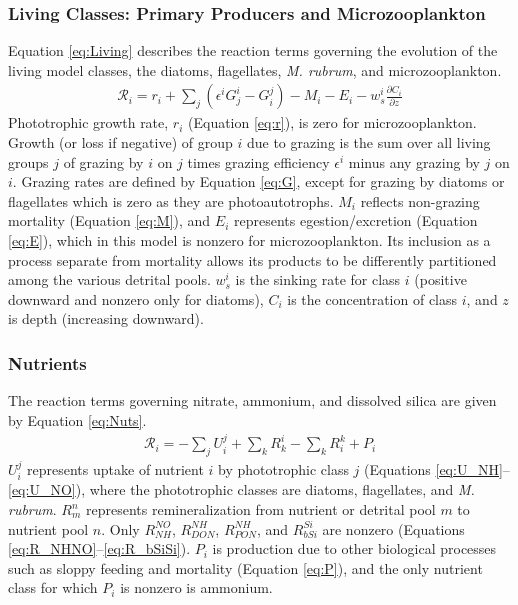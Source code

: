\documentclass[draft,jgrga]{agutexSI2019}
\begin{document}
\begin{article}
\subsubsection*{Living Classes: Primary Producers and Microzooplankton}

Equation \ref{eq:Living} describes the reaction terms governing the evolution of the living model classes, the diatoms, flagellates, \textit{M. rubrum}, and microzooplankton.
\begin{align}
  \mathcal{R}_i =r_i+\sum_{j}\left(\epsilon^i G_j^i-G_i^j\right)-M_i-E_i-w_s^i \frac{\partial C_i}{\partial z} 
\label{eq:Living}
\end{align}  
Phototrophic growth rate, $r_i$ (Equation \ref{eq:r}), is zero for microzooplankton. 
Growth (or loss if negative) of group $i$ due to grazing is the sum over all living groups $j$ of grazing by $i$ on $j$ times grazing efficiency $\epsilon ^i$ minus any grazing by $j$ on $i$. Grazing rates are defined by Equation \ref{eq:G}, except for grazing by diatoms or flagellates which is zero as they are photoautotrophs.
$M_i$ reflects non-grazing mortality (Equation \ref{eq:M}), and $E_i$ represents egestion/excretion (Equation \ref{eq:E}), which in this model is nonzero for microzooplankton. Its inclusion as a process separate from mortality allows its products to be differently partitioned among the various detrital pools. 
$w_s^i$ is the sinking rate for class $i$ (positive downward and nonzero only for diatoms), $C_i$ is the concentration of class $i$, and $z$ is depth (increasing downward).

\subsubsection*{Nutrients} %
The reaction terms governing nitrate, ammonium, and dissolved silica are given by Equation \ref{eq:Nuts}.
\begin{align}
  \mathcal{R}_i =-\sum_{j}U_i^j+\sum_{k}R_k^i-\sum_{k}R_i^k+P_i
\label{eq:Nuts}
\end{align}  
$U_i^j$ represents uptake of nutrient $i$ by phototrophic class $j$ (Equations \ref{eq:U_NH}--\ref{eq:U_NO}), where the phototrophic classes are diatoms, flagellates, and \textit{M. rubrum}. $R_m^n$ represents remineralization from nutrient or detrital pool $m$ to nutrient pool $n$.
Only $R_{NH}^{NO}$, $R_{DON}^{NH}$, $R_{PON}^{NH}$, and $R_{bSi}^{Si}$ are nonzero (Equations \ref{eq:R_NHNO}--\ref{eq:R_bSiSi}). $P_i$ is production due to other biological processes such as sloppy feeding and mortality (Equation \ref{eq:P}), and the only nutrient class for which $P_i$ is nonzero is ammonium.


\end{article}
\end{document}
